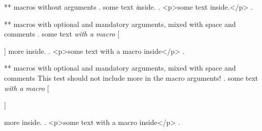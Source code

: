 ** macros without arguments
.
some text \emph inside.
.
<p>some text inside.</p>
.

** macros with optional and mandatory arguments, mixed with space and comments
.
some text \emph{with a macro} [%

 ]
 {more} inside.
.
<p>some text with a macro inside</p>
.


** macros with optional and mandatory arguments, mixed with space and comments
This test should not include {more} in the macro arguments!
.
some text \emph{with a macro} [%

 ]%

  {more} inside.
.
<p>some text with a macro inside</p>
.

